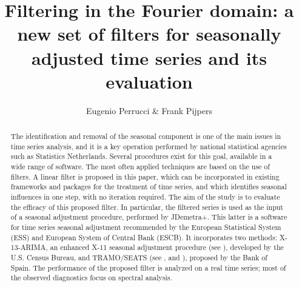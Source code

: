 \documentclass[english,blauw]{cbsdiscussionpaper}
\title{Filtering in the Fourier domain: a new set of filters for seasonally adjusted time series and its evaluation}
\author{Eugenio Perrucci \& Frank Pijpers}
\begin{document}
\maketitle

\tableofcontents
\clearpage

\begin{abstract}
The identification and removal of the seasonal component is one of the main issues in time series analysis, and it is a key operation performed by national statistical agencies such as Statistics Netherlands. Several procedures exist for this goal, available in a wide range of software. The most often applied techniques are based on the use of filters.  A linear filter is proposed in this paper, which can be incorporated in existing frameworks and packages for the treatment of time series, and which identifies seasonal influences in one step, with no iteration required. The aim of the study is to evaluate the efficacy of this proposed filter. In particular, the filtered series is used as the input of a seasonal adjustment procedure, performed by JDemetra+. This latter is a software for time series seasonal adjustment recommended by the European Statistical System (ESS) and European System of Central Bank (ESCB). It incorporates two methods: X-13-ARIMA, an enhanced X-11 seasonal adjustment procedure (see \citep{can1980}), developed by the U.S. Census Bureau, and TRAMO/SEATS (see \citep{margo1997}, and \citep{marsa2000}), proposed by the Bank of Spain. The performance of the proposed filter is analyzed on a real time series; most of the observed diagnostics focus on spectral analysis.
\end{abstract}
\end{document}
